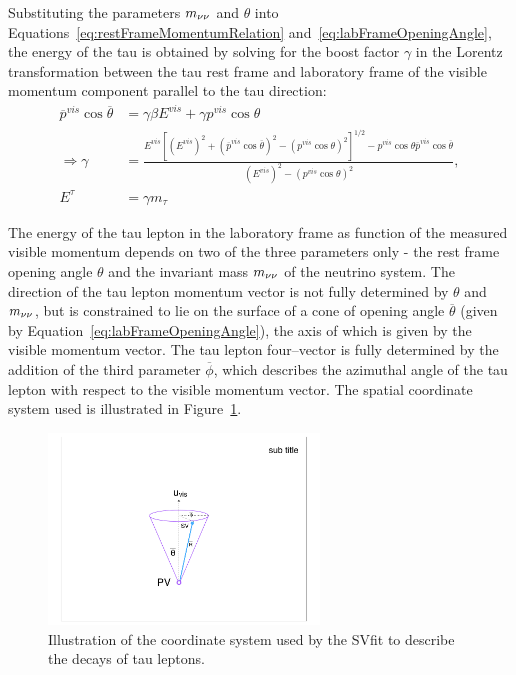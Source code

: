Substituting the parameters $m_{\nu\nu}$ and $\theta$ into
Equations~\ref{eq:restFrameMomentumRelation} and~\ref{eq:labFrameOpeningAngle},
the energy of the tau is obtained by solving for the boost factor $\gamma$ in
the Lorentz transformation between the tau rest frame and laboratory frame of the
visible momentum component parallel to the tau direction:
\begin{align}
\overline{p}^{vis} \cos \overline{\theta} &= \gamma \beta E^{vis} + \gamma p^{vis} \cos\theta \nonumber \\ 
\Rightarrow \gamma &= \frac{E^{vis}[{\left( E^{vis} \right)^2 + \left( \overline{p}^{vis} \cos \overline{\theta} \right)^2 
 - \left( p^{vis} \cos \theta \right)^2}]^{1/2} - p^{vis} \cos \theta \overline{p}^{vis} \cos \overline{\theta}}{\left( E^{vis} \right)^2 
 - \left( p^{vis} \cos \theta \right)^2}, \nonumber \\
E^{\tau} &= \gamma m_\tau \nonumber
\end{align}

The energy of the tau lepton in the laboratory frame as function of the measured
visible momentum depends on two of the three parameters only - the rest frame
opening angle $\theta$ and the invariant mass $m_{\nu\nu}$ of the neutrino system.
The direction of the tau lepton momentum vector is not fully determined by
$\theta$ and $m_{\nu\nu}$, but is constrained to lie on the surface of a cone of
opening angle $\overline{\theta}$ (given by Equation~\ref{eq:labFrameOpeningAngle}),
the axis of which is given by the visible momentum vector.  The tau lepton
four--vector is fully determined by the addition of the third parameter
$\overline{\phi}$, which describes the azimuthal angle of the tau lepton with respect
to the visible momentum vector.  The spatial coordinate system used is
illustrated in Figure~\ref{fig:svFitDecayParDiagram}.

\begin{figure}[t]
\begin{center}
\includegraphics*[width=72mm]{svfit_chapter/figures/decay_parameters_graphic.pdf}
\caption[Coordinate system of the SVfit]{Illustration of the coordinate system
used by the SVfit to describe the decays of tau leptons.}
\label{fig:svFitDecayParDiagram}
\end{center}
\end{figure} 

